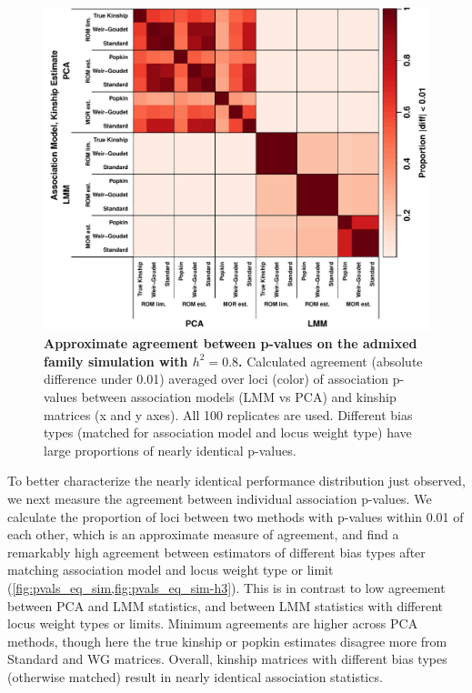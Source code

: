 \documentclass[11pt]{article}
\begin{document}
\begin{linenumbers}
\begin{figure}[bp!]
  \centering
  \includegraphics[width=\textwidth]{sim-admix-n1000-m100000-k3-f0.3-s0.5-mc100-h0.8-g20-fes/pvals_eq.pdf}
  \caption{
    {\bf Approximate agreement between p-values on the admixed family simulation with $h^2=0.8$.}
    Calculated agreement (absolute difference under 0.01) averaged over loci (color) of association p-values between association models (LMM vs PCA) and kinship matrices (x and y axes).
    All 100 replicates are used.
    Different bias types (matched for association model and locus weight type) have large proportions of nearly identical p-values.
    }
  \label{fig:pvals_eq_sim}
\end{figure}

To better characterize the nearly identical performance distribution just observed, we next measure the agreement between individual association p-values.
We calculate the proportion of loci between two methods with p-values within 0.01 of each other, which is an approximate measure of agreement, and find a remarkably high agreement between estimators of different bias types after matching association model and locus weight type or limit (\cref{fig:pvals_eq_sim,fig:pvals_eq_sim-h3}).
This is in contrast to low agreement between PCA and LMM statistics, and between LMM statistics with different locus weight types or limits.
Minimum agreements are higher across PCA methods, though here the true kinship or popkin estimates disagree more from Standard and WG matrices.
Overall, kinship matrices with different bias types (otherwise matched) result in nearly identical association statistics.


\end{linenumbers}
\end{document}
